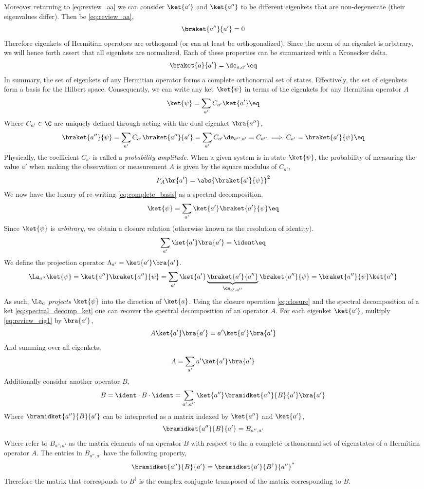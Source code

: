\documentclass{article}
\begin{document}
Moreover returning to \cref{eq:review_aa} we can consider $\ket{a'}$ and $\ket{a''}$ to be different eigenkets that are non-degenerate (their eigenvalues differ). Then be \cref{eq:review_aa},
\[ \braket{a''}{a'} = 0 \]
Therefore eigenkets of Hermitian operators are orthogonal (or can at least be orthogonalized). Since the norm of an eigenket is arbitrary, we will hence forth assert that all eigenkets are normalized. Each of these properties can be summarized with a Kronecker delta.
\[ \braket{a}{a'} = \de_{a, a'} \eq \label{eq:orthonormality_discrete}\]
In summary, the set of eigenkets of any Hermitian operator forms a complete orthonormal set of states. Effectively, the set of eigenkets form a basis for the Hilbert space. Consequently, we can write any ket $\ket{\psi}$ in terms of the eigenkets for any Hermitian operator $A$
\[ \ket{\psi} = \sum_{a'} C_{a'} \ket{a'} \eq \label{eq:complete_basis}\]
Where $C_{a'} \in \C$ are uniquely defined through acting with the dual eigenket $\bra{a''}$,
\[ \braket{a''}{\psi} = \sum_{a'} C_{a'} \braket{a''}{a'} = \sum_{a'} C_{a'} \de_{a'', a'} = C_{a''} \implies C_{a'} = \braket{a'}{\psi} \eq \label{eq:coeff_determine}\]
Physically, the coefficient $C_{a'}$ is called a \textit{probability amplitude}. When a given system is in state $\ket{\psi}$, the probability of measuring the value $a'$ when making the observation or measurement $A$ is given by the square modulus of $C_{a'}$,
\[ P_{A}\br{a'} = \abs{\braket{a'}{\psi}}^2 \]
We now have the luxury of re-writing \cref{eq:complete_basis} as a spectral decomposition,
\[ \ket{\psi} = \sum_{a'} \ket{a'} \braket{a'}{\psi} \eq \label{eq:spectral_decomp_ket} \]
Since $\ket{\psi}$ is \textit{arbitrary}, we obtain a closure relation (otherwise known as the resolution of identity).
\[ \sum_{a'} \ket{a'} \bra{a'} = \ident \eq \label{eq:closure} \]
We define the projection operator $\Lambda_{a'} = \ket{a'}\bra{a'}$.
\[ \La_{a''}\ket{\psi} = \ket{a''}\braket{a''}{\psi} = \sum_{a'} \ket{a'}\underbrace{\braket{a'}{a''}}_{\de_{a', a''}}\braket{a''}{\psi} = \braket{a''}{\psi}\ket{a''} \]
As such, $\La_{a}$ \textit{projects} $\ket{\psi}$ into the direction of $\ket{a}$. Using the closure operation \cref{eq:closure} and the spectral decomposition of a ket \cref{eq:spectral_decomp_ket} one can recover the spectral decomposition of an operator $A$. For each eigenket $\ket{a'}$, multiply \cref{eq:review_eig1} by $\bra{a'}$,
\[ A \ket{a'} \bra{a'} = a' \ket{a'} \bra{a'} \]
And summing over all eigenkets,
\[ A = \sum_{a'} a' \ket{a'}\bra{a'} \]
Additionally consider another operator $B$,
\[ B = \ident \cdot B \cdot \ident = \sum_{a', a''} \ket{a''}\bramidket{a''}{B}{a'}\bra{a'} \]
Where $\bramidket{a''}{B}{a'}$ can be interpreted as a matrix indexed by $\ket{a''}$ and $\ket{a'}$,
\[ \bramidket{a''}{B}{a'} = B_{a'', a'} \]
Where refer to $B_{a'', a'}$ as the matrix elements of an operator $B$ with respect to the a complete orthonormal set of eigenstates of a Hermitian operator $A$. The entries in $B_{a'', a'}$ have the following property,
\[ \bramidket{a''}{B}{a'} = \bramidket{a'}{B^{\dagger}}{a''}^{*} \]
Therefore the matrix that corresponds to $B^{\dagger}$ is the complex conjugate transposed of the matrix corresponding to $B$.\\
\end{document}
